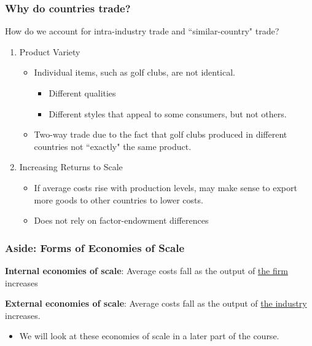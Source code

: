 \documentclass{beamer}
\begin{document}
\begin{frame}
	\frametitle{Why do countries trade?}
How do we account for intra-industry trade and ``similar-country" trade?
\begin{enumerate}
	\item Product Variety
		\begin{itemize}
			\item Individual items, such as golf clubs, are not identical.
				\begin{itemize}
					\item Different qualities
					\item Different styles that appeal to some consumers, but not others.
				\end{itemize}
			\item Two-way trade due to the fact that golf clubs produced in different countries not ``exactly" the same product.
		\end{itemize}
	\item Increasing Returns to Scale
		\begin{itemize}
			\item If average costs rise with production levels, may make sense to export more goods to other countries to lower costs.
			\item Does not rely on factor-endowment differences
		\end{itemize}
\end{enumerate}
\end{frame}


\begin{frame}
	\frametitle{Aside: Forms of Economies of Scale}
	
	\noindent \textbf{Internal economies of scale}: Average costs fall as the output of \underline{the firm} increases\\
	
   \vspace{8mm}
	
	\noindent \textbf{External economies of scale}: Average costs fall as the output of \underline{the industry} increases.\\
		\begin{itemize}
			\item We will look at these economies of scale in a later part of the course.
		\end{itemize}
	
\end{frame}
\end{document}
